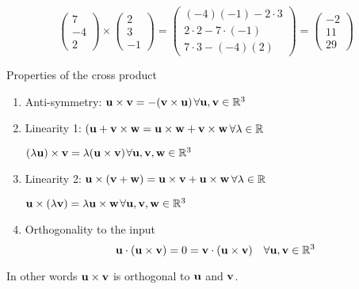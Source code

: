 \documentclass[10pt, a4paper]{article}
\begin{document}
\begin{example}
    \[
    \begin{pmatrix}
        7 \\ -4 \\ 2   
    \end{pmatrix}
    \times
    \begin{pmatrix}
        2 \\ 3 \\ -1
    \end{pmatrix}
    =
    \begin{pmatrix}
        (-4)(-1) - 2 \cdot 3 \\
        2 \cdot 2 - 7 \cdot (-1) \\
        7 \cdot 3 - (-4)(2)
    \end{pmatrix}
    =
    \begin{pmatrix}
        -2 \\ 11 \\ 29
    \end{pmatrix}
    \]
\end{example}

Properties of the cross product
\begin{enumerate}[label = (\roman*)]
    \item Anti-symmetry: $\mathbf{u \times v} = -(\mathbf{v \times u})$\quad$\forall\mathbf{u, v} \in \mathbb{R} ^ 3$
    \item Linearity 1:
    $(\mathbf{u + v} \times \mathbf{w} = \mathbf{u \times w} + \mathbf{v \times w}$\quad$\forall\lambda \in \mathbb{R}$
    
    $(\lambda\mathbf{u}) \times \mathbf{v} = \lambda(\mathbf{u \times v})$\quad$\forall\mathbf{u, v, w} \in \mathbb{R} ^ 3$
    
    \item Linearity 2:
    $\mathbf{u} \times (\mathbf{v + w}) = \mathbf{u \times v + u \times w}$\quad$\forall\lambda \in \mathbb{R}$
    
    $\mathbf{u} \times (\lambda\mathbf{v}) = \lambda\mathbf{u \times w}$\quad$\forall\mathbf{u, v, w} \in \mathbb{R} ^ 3$

    \item Orthogonality to the input
    \[
    \mathbf{u \cdot (u \times v)} = 0 = \mathbf{v \cdot (u \times v)}\quad\forall\mathbf{u, v} \in \mathbb{R} ^ 3
    \]
\end{enumerate}
In other words $\mathbf{u \times v}$ is orthogonal to $\mathbf{u}$ and $\mathbf{v}$.
\end{document}
